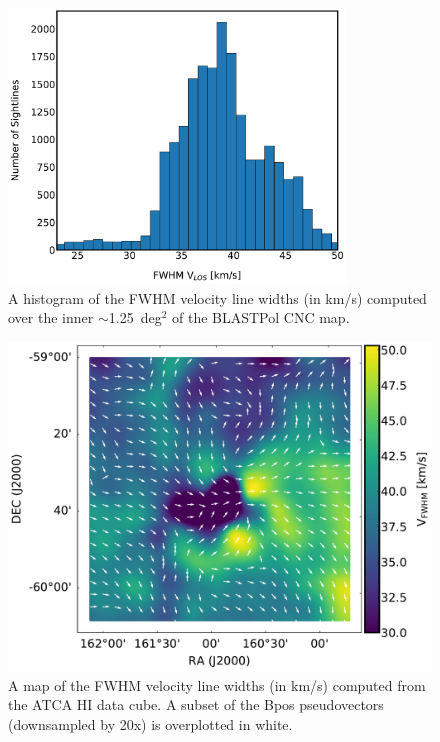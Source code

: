 \begin{figure}[!htbp]
\centering
\includegraphics[width=0.8\textwidth]{figures/carina/VLOS_hist}
\caption[~A histogram of the FWHM velocity line widths computed over the inner  of the BLASTPol CNC map.]{A histogram of the FWHM velocity line widths (in km/s) computed over the inner $\sim$1.25~deg$^{2}$ of the BLASTPol CNC map.}
\label{fig:vfwhm_hist}
\end{figure}

\begin{figure}[!htbp]
\centering
\includegraphics[width=\textwidth]{figures/carina/VFWHM_vectors}
\caption[~A map of the FWHM velocity line widths computed from the ATCA HI data cube.]{A map of the FWHM velocity line widths (in km/s) computed from the ATCA $\mathrm{HI}$ data cube. A subset of the \gls{Bpos} pseudovectors (downsampled by 20x) is overplotted in white.}
\label{fig:vfwhm_map}
\end{figure}

